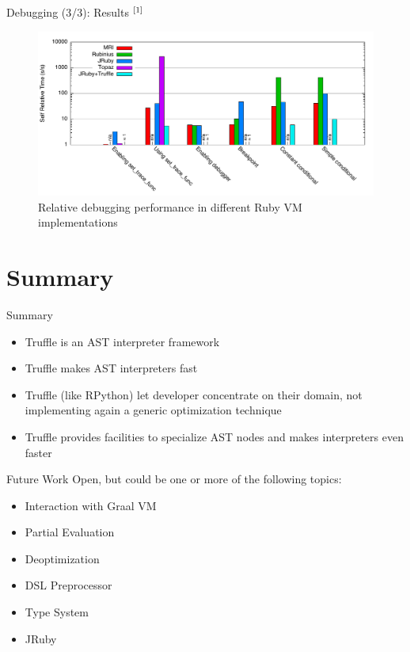 \documentclass[xcolor=dvipsname,handout]{beamer}
\newcommand{\up}[1]{\ensuremath{^{{\tiny#1}}}}
\begin{document}
\begin{frame}{Debugging (3/3): Results \up{[1]}}
  \begin{figure}
    \includegraphics[width=\textwidth]{performance-debugging.pdf}
    \caption{Relative debugging performance in different Ruby VM implementations}
    \label{fig:debuggin_performance}
  \end{figure}
\end{frame}


\section{Summary}

\begin{frame}{Summary}
  \begin{itemize}
    \item Truffle is an AST interpreter framework
    \item Truffle makes AST interpreters fast
    \item Truffle (like RPython) let developer concentrate on their domain, not implementing again a generic optimization technique
    \item Truffle provides facilities to specialize AST nodes and makes interpreters even faster
  \end{itemize}
\end{frame}

\begin{frame}{Future Work}
    Open, but could be one or more of the following topics:
    \begin{itemize}
        \item Interaction with Graal VM
        \item Partial Evaluation
        \item Deoptimization
        \item DSL Preprocessor
        \item Type System
        \item JRuby
    \end{itemize}
\end{frame}
\end{document}
